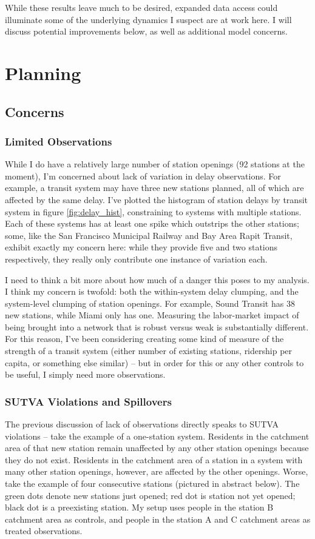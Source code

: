 \documentclass[12pt]{article}
\begin{document}
While these results leave much to be desired, expanded data access could illuminate some of the underlying dynamics I suspect are at work here. I will discuss potential improvements below, as well as additional model concerns. 

\section{Planning}
\subsection{Concerns}
\subsubsection{Limited Observations}\label{subsubsec:lim_obs}
While I do have a relatively large number of station openings (92 stations at the moment), I'm concerned about lack of variation in delay observations. For example, a transit system may have three new stations planned, all of which are affected by the same delay. I've plotted the histogram of station delays by transit system in figure \ref{fig:delay_hist}, constraining to systems with multiple stations. Each of these systems has at least one spike which outstrips the other stations; some, like the San Francisco Municipal Railway and Bay Area Rapit Transit, exhibit exactly my concern here: while they provide five and two stations respectively, they really only contribute one instance of variation each. 

I need to think a bit more about how much of a danger this poses to my analysis. I think my concern is twofold: both the within-system delay clumping, and the system-level clumping of station openings. For example, Sound Transit has 38 new stations, while Miami only has one. Measuring the labor-market impact of being brought into a network that is robust versus weak is substantially different. For this reason, I've been considering creating some kind of measure of the strength of a transit system (either number of existing stations, ridership per capita, or something else similar)  --  but in order for this or any other controls to be useful, I simply need more observations. 

\subsubsection{SUTVA Violations and Spillovers}
The previous discussion of lack of observations directly speaks to SUTVA violations  --  take the example of a one-station system. Residents in the catchment area of that new station remain unaffected by any other station openings because they do not exist. Residents in the catchment area of a station in a system with many other station openings, however, are affected by the other openings. Worse, take the example of four consecutive stations (pictured in abstract below). The green dots denote new stations just opened; red dot is station not yet opened; black dot is a preexisting station. My setup uses people in the station B catchment area as controls, and people in the station A and C catchment areas as treated observations. 
\end{document}
